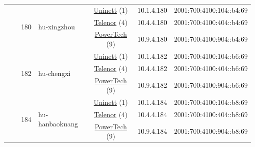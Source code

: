 \begin{small}
\begin{center}
\begin{longtable}{|c|c|c|c|c|c|c|c|}
  &  & \multirow{3}{*}{\tiny{180}} & \multicolumn{1}{|l|}{\multirow{3}{*}{\tiny{hu-xingzhou}}} & \multicolumn{2}{|c|}{\tiny{\href{https://www.uninett.no}{Uninett} (1)}} & \tiny{10.1.4.180} & \tiny{2001:700:4100:104::b4:69} \\* \cline{5-5}\cline{6-6}\cline{7-7}\cline{8-8}
  &  &  &  & \multicolumn{2}{|c|}{\tiny{\href{https://www.telenor.no}{Telenor} (4)}} & \tiny{10.4.4.180} & \tiny{2001:700:4100:404::b4:69} \\* \cline{5-5}\cline{6-6}\cline{7-7}\cline{8-8}
  &  &  &  & \multicolumn{2}{|c|}{\tiny{\href{http://www.powertech.no}{PowerTech} (9)}} & \tiny{10.9.4.180} & \tiny{2001:700:4100:904::b4:69} \\* \cline{3-3}\cline{4-4}\cline{5-5}\cline{6-6}\cline{7-7}\cline{8-8}
  &  & \multirow{3}{*}{\tiny{182}} & \multicolumn{1}{|l|}{\multirow{3}{*}{\tiny{hu-chengxi}}} & \multicolumn{2}{|c|}{\tiny{\href{https://www.uninett.no}{Uninett} (1)}} & \tiny{10.1.4.182} & \tiny{2001:700:4100:104::b6:69} \\* \cline{5-5}\cline{6-6}\cline{7-7}\cline{8-8}
  &  &  &  & \multicolumn{2}{|c|}{\tiny{\href{https://www.telenor.no}{Telenor} (4)}} & \tiny{10.4.4.182} & \tiny{2001:700:4100:404::b6:69} \\* \cline{5-5}\cline{6-6}\cline{7-7}\cline{8-8}
  &  &  &  & \multicolumn{2}{|c|}{\tiny{\href{http://www.powertech.no}{PowerTech} (9)}} & \tiny{10.9.4.182} & \tiny{2001:700:4100:904::b6:69} \\* \cline{3-3}\cline{4-4}\cline{5-5}\cline{6-6}\cline{7-7}\cline{8-8}
  &  & \multirow{3}{*}{\tiny{184}} & \multicolumn{1}{|l|}{\multirow{3}{*}{\tiny{hu-hanbaokuang}}} & \multicolumn{2}{|c|}{\tiny{\href{https://www.uninett.no}{Uninett} (1)}} & \tiny{10.1.4.184} & \tiny{2001:700:4100:104::b8:69} \\* \cline{5-5}\cline{6-6}\cline{7-7}\cline{8-8}
  &  &  &  & \multicolumn{2}{|c|}{\tiny{\href{https://www.telenor.no}{Telenor} (4)}} & \tiny{10.4.4.184} & \tiny{2001:700:4100:404::b8:69} \\* \cline{5-5}\cline{6-6}\cline{7-7}\cline{8-8}
  &  &  &  & \multicolumn{2}{|c|}{\tiny{\href{http://www.powertech.no}{PowerTech} (9)}} & \tiny{10.9.4.184} & \tiny{2001:700:4100:904::b8:69} \\ \hline
\end{longtable}
\end{center}
\end{small}



